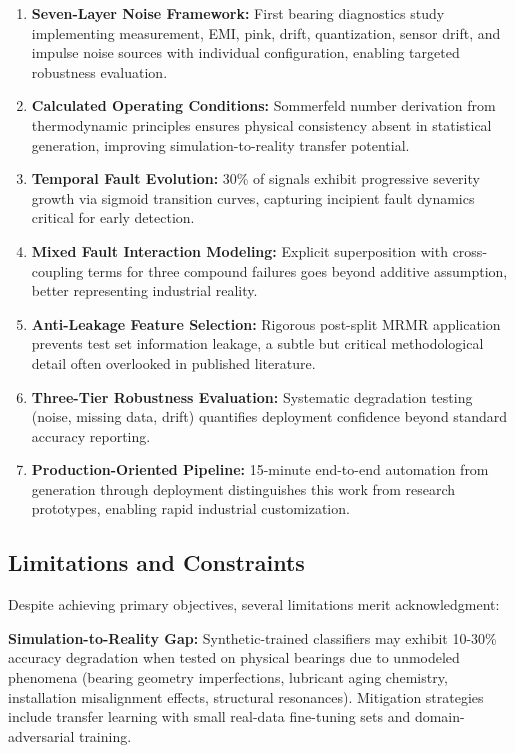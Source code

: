 \documentclass[11pt,a4paper]{article}
\begin{document}
\begin{enumerate}[itemsep=0.3em]
    \item \textbf{Seven-Layer Noise Framework:} First bearing diagnostics study implementing measurement, EMI, pink, drift, quantization, sensor drift, and impulse noise sources with individual configuration, enabling targeted robustness evaluation.
    
    \item \textbf{Calculated Operating Conditions:} Sommerfeld number derivation from thermodynamic principles ensures physical consistency absent in statistical generation, improving simulation-to-reality transfer potential.
    
    \item \textbf{Temporal Fault Evolution:} 30\% of signals exhibit progressive severity growth via sigmoid transition curves, capturing incipient fault dynamics critical for early detection.
    
    \item \textbf{Mixed Fault Interaction Modeling:} Explicit superposition with cross-coupling terms for three compound failures goes beyond additive assumption, better representing industrial reality.
    
    \item \textbf{Anti-Leakage Feature Selection:} Rigorous post-split MRMR application prevents test set information leakage, a subtle but critical methodological detail often overlooked in published literature.
    
    \item \textbf{Three-Tier Robustness Evaluation:} Systematic degradation testing (noise, missing data, drift) quantifies deployment confidence beyond standard accuracy reporting.
    
    \item \textbf{Production-Oriented Pipeline:} 15-minute end-to-end automation from generation through deployment distinguishes this work from research prototypes, enabling rapid industrial customization.
\end{enumerate}

\subsection{Limitations and Constraints}

Despite achieving primary objectives, several limitations merit acknowledgment:

\textbf{Simulation-to-Reality Gap:} Synthetic-trained classifiers may exhibit 10-30\% accuracy degradation when tested on physical bearings due to unmodeled phenomena (bearing geometry imperfections, lubricant aging chemistry, installation misalignment effects, structural resonances). Mitigation strategies include transfer learning with small real-data fine-tuning sets and domain-adversarial training.
\end{document}
